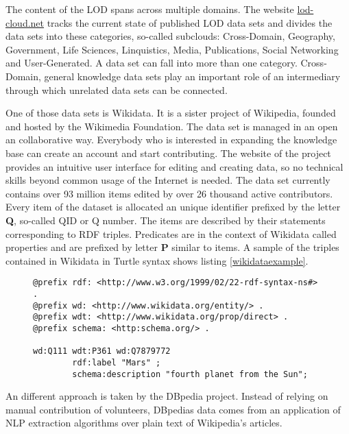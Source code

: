 The content of the LOD spans across multiple domains. The website \href{http://lod-cloud.net}{lod-cloud.net} tracks the current state of published LOD data sets and divides the data sets into these categories, so-called subclouds: Cross-Domain, Geography, Government, Life Sciences, Linquistics, Media, Publications, Social Networking and User-Generated. A data set can fall into more than one category. Cross-Domain, general knowledge data sets play an important role of an intermediary through which unrelated data sets can be connected. 

One of those data sets is Wikidata. It is a sister project of Wikipedia, founded and hosted by the Wikimedia Foundation. The data set is managed in an open an collaborative way. Everybody who is interested in expanding the knowledge base can create an account and start contributing. The website of the project provides an intuitive user interface for editing and creating data, so no technical skills beyond common usage of the Internet is needed. The data set currently contains over 93 million items edited by over 26 thousand active contributors. Every item of the dataset is allocated an unique identifier prefixed by the letter \textbf{Q}, so-called QID or Q number. The items are described by their statements corresponding to RDF triples. Predicates are in the context of Wikidata called properties and are prefixed by letter \textbf{P} similar to items. A sample of the triples contained in Wikidata in Turtle syntax shows listing \ref{wikidataexample}.

\begin{figure}[h]
\begin{lstlisting}[language = Turtle, caption={Wikidata content sample (Source: author)}, label={wikidataexample},captionpos=b escapeinside={(*@}{@*)}]
@prefix rdf: <http://www.w3.org/1999/02/22-rdf-syntax-ns#> .
@prefix wd: <http://www.wikidata.org/entity/> .
@prefix wdt: <http://www.wikidata.org/prop/direct> .
@prefix schema: <http:schema.org/> .

wd:Q111 wdt:P361 wd:Q7879772
        rdf:label "Mars" ;
        schema:description "fourth planet from the Sun";
\end{lstlisting}
\end{figure}

An different approach is taken by the DBpedia project. Instead of relying on manual contribution of volunteers, DBpedias data comes from an application of NLP extraction algorithms over plain text of Wikipedia's articles. 

